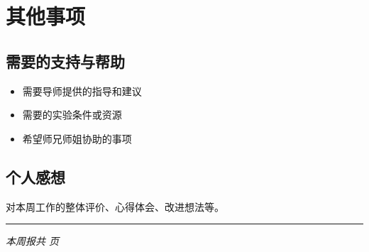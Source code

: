 \documentclass[12pt,a4paper]{article}
\begin{document}
\section{其他事项}

\subsection{需要的支持与帮助}
\begin{itemize}
    \item 需要导师提供的指导和建议
    \item 需要的实验条件或资源
    \item 希望师兄师姐协助的事项
\end{itemize}

\subsection{个人感想}
对本周工作的整体评价、心得体会、改进想法等。

\vspace{1cm}
\noindent\rule{\textwidth}{0.5pt}
\begin{center}
\textit{本周报共 \pageref{LastPage} 页}
\end{center}
\end{document}
